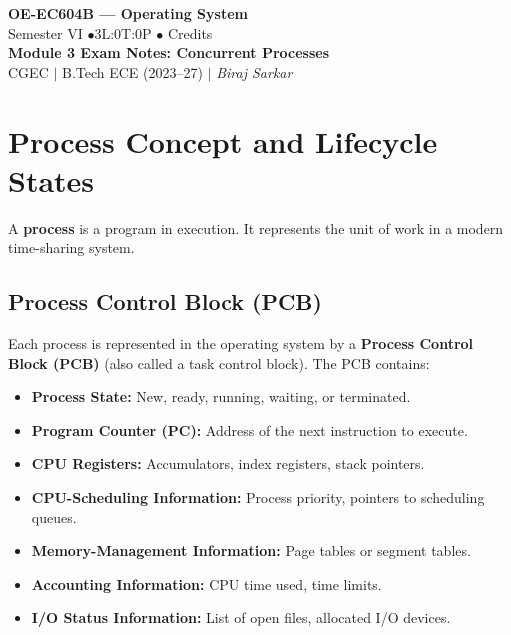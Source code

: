 \documentclass[12pt,a4paper]{article}
\begin{document}

\begin{center}
  {\LARGE\bfseries\color{myred} OE-EC604B --- Operating System}\\[5pt]
  {\normalsize\color{mydark} Semester VI \quad$\bullet$\quad 3L:0T:0P \quad$\bullet$ Credits}\\[3pt]
  {\normalsize\color{myteal}\textbf{Module 3 Exam Notes: Concurrent Processes}}\\[3pt]
  {\small\color{mydark} CGEC \;$|$\; B.Tech ECE (2023--27) \;$|$\; \textit{Biraj Sarkar}}
\end{center}
\vspace{2pt}
\noindent{\color{myred}\rule{\linewidth}{1.5pt}}
\vspace{2pt}

\hypersetup{linkcolor=mydark}
\tableofcontents
\hypersetup{linkcolor=myteal}
\newpage

\section{Process Concept and Lifecycle States}

A \textbf{process} is a program in execution. It represents the unit of work in a modern time-sharing system.

\subsection{Process Control Block (PCB)}
Each process is represented in the operating system by a \textbf{Process Control Block (PCB)} (also called a task control block). The PCB contains:
\begin{itemize}[leftmargin=*, itemsep=3pt]
  \item \textbf{Process State:} New, ready, running, waiting, or terminated.
  \item \textbf{Program Counter (PC):} Address of the next instruction to execute.
  \item \textbf{CPU Registers:} Accumulators, index registers, stack pointers.
  \item \textbf{CPU-Scheduling Information:} Process priority, pointers to scheduling queues.
  \item \textbf{Memory-Management Information:} Page tables or segment tables.
  \item \textbf{Accounting Information:} CPU time used, time limits.
  \item \textbf{I/O Status Information:} List of open files, allocated I/O devices.
\end{itemize}
\end{document}
